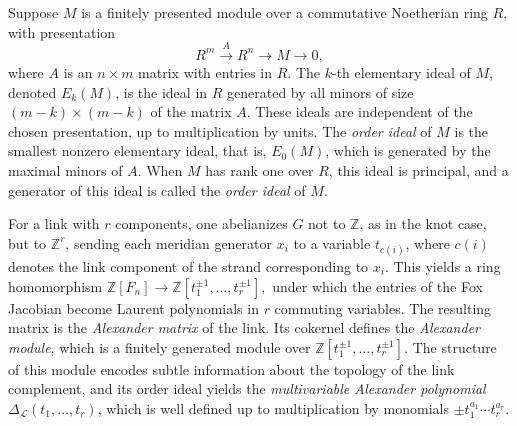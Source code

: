 \documentclass[table]{amsart}
\numberwithin{equation}{section}
\begin{document}
\par Suppose \(M\) is a finitely presented module over a commutative Noetherian ring \(R\), with presentation
\[
R^m \xrightarrow{A} R^n \longrightarrow M \longrightarrow 0,
\]
where \(A\) is an \(n\times m\) matrix with entries in \(R\). The \(k\)-th elementary ideal of \(M\), denoted \(E_k(M)\), is the ideal in \(R\) generated by all minors of size \((m-k)\times(m-k)\) of the matrix \(A\). These ideals are independent of the chosen presentation, up to multiplication by units. The \emph{order ideal} of \(M\) is the smallest nonzero elementary ideal, that is, \(E_0(M)\), which is generated by the maximal minors of \(A\). When \(M\) has rank one over \(R\), this ideal is principal, and a generator of this ideal is called the \emph{order ideal} of \(M\).  


\par For a link with $r$ components, one abelianizes $G$ not to $\mathbb Z$, as in the knot case, but to $\mathbb Z^r$, sending each meridian generator $x_i$ to a variable $t_{c(i)}$, where $c(i)$ denotes the link component of the strand corresponding to $x_i$. This yields a ring homomorphism $
\mathbb{Z}[F_n] \longrightarrow \mathbb{Z}[t_1^{\pm1},\dots,t_r^{\pm1}],
$ under which the entries of the Fox Jacobian become Laurent polynomials in $r$ commuting variables. The resulting matrix is the \emph{Alexander matrix} of the link. Its cokernel defines the \emph{Alexander module}, which is a finitely generated module over $\mathbb{Z}[t_1^{\pm1},\dots,t_r^{\pm1}]$. The structure of this module encodes subtle information about the topology of the link complement, and its order ideal yields the \emph{multivariable Alexander polynomial} $\Delta_{\mathcal L}(t_1,\dots,t_r)$, which is well defined up to multiplication by monomials $\pm t_1^{a_1}\cdots t_r^{a_r}$. 
\end{document}
